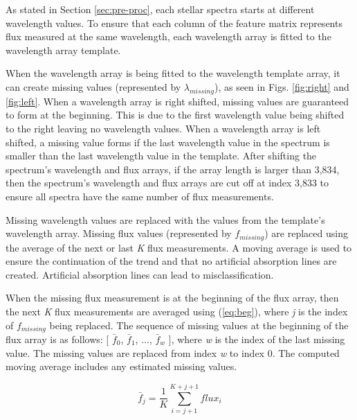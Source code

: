 \documentclass[conference]{IEEEtran}
\begin{document}
        As stated in Section \ref{sec:pre-proc}, each stellar spectra starts at different wavelength values. To ensure that each column of the feature matrix represents flux measured at the same wavelength, each wavelength array is fitted to the wavelength array template. 

        When the wavelength array is being fitted to the wavelength template array, it can create missing values (represented by $\lambda_{missing}$), as seen in Figs. \ref{fig:right} and \ref{fig:left}. When a wavelength array is right shifted, missing values are guaranteed to form at the beginning. This is due to the first wavelength value being shifted to the right leaving no wavelength values. When a wavelength array is left shifted, a missing value forms if the last wavelength value in the spectrum is smaller than the last wavelength value in the template. After shifting the spectrum's wavelength and flux arrays, if the array length is larger than 3,834, then the spectrum's wavelength and flux arrays are cut off at index 3,833 to ensure all spectra have the same number of flux measurements.
        
        Missing wavelength values are replaced with the values from the template's wavelength array. Missing flux values (represented by $f_{missing}$) are replaced using the average of the next or last \textit{K} flux measurements. A moving average is used to ensure the continuation of the trend and that no artificial absorption lines are created. Artificial absorption lines can lead to misclassification.

        When the missing flux measurement is at the beginning of the flux array, then the next \textit{K} flux measurements are averaged using (\ref{eq:beg}), where \textit{j} is the index of $f_{missing}$ being replaced. The sequence of missing values at the beginning of the flux array is as follows: [ $\bar{f}_0$, $\bar{f}_1$, ..., $\bar{f}_w$ ], where \textit{w} is the index of the last missing value. The missing values are replaced from index \textit{w} to index 0. The computed moving average includes any estimated missing values.
        
        \begin{equation}\label{eq:beg}
            \bar{f}_j = \frac{1}{K} \sum_{i = j+1}^{K+j+1} flux_{i}
        \end{equation}
        
\end{document}
